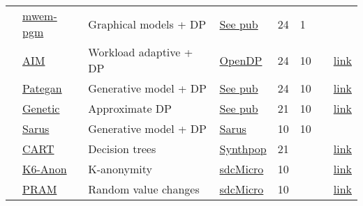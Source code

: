 \begin{table}
\begin{tabular}{llllllll}
        \cellcolor{ForestGreen} & \href{https://htmlpreview.github.io/?https://github.com/yoid2000/sdnist-summary/blob/main/results/mwem_pgm/report.html}{mwem-pgm} & Graphical models + DP & \href{https://dream.cs.umass.edu/}{See pub} & 24 & 1 & \cite{mckenna2019graphical} &  \\
        \cellcolor{ForestGreen} & \href{https://htmlpreview.github.io/?https://github.com/yoid2000/sdnist-summary/blob/main/results/aim_e_10_all/report.html}{AIM} & Workload adaptive + DP & \href{https://opendp.org/}{OpenDP} & 24 & 10 & \cite{mckenna2022aim} & \href{https://github.com/opendp/smartnoise-sdk}{link} \\
        \cellcolor{ForestGreen} & \href{https://htmlpreview.github.io/?https://github.com/yoid2000/sdnist-summary/blob/main/results/pategan_n_iter_50_e_10_all/report.html}{Pategan} & Generative model + DP & \href{https://github.com/PerceptionLab-DurhamUniversity/pategan}{See pub} & 24 & 10 & \cite{jordon2018pate} & \href{https://github.com/PerceptionLab-DurhamUniversity/pategan}{link} \\
        \cellcolor{YellowGreen} & \href{https://htmlpreview.github.io/?https://github.com/yoid2000/sdnist-summary/blob/main/results/genetic_sd_e_10_simple/report.html}{Genetic} & Approximate DP & \href{https://github.com/giusevtr/private_gsd}{See pub} & 21 & 10 & \cite{liu2023generating} & \href{https://github.com/giusevtr/private_gsd}{link} \\
        \cellcolor{YellowGreen} & \href{https://htmlpreview.github.io/?https://github.com/yoid2000/sdnist-summary/blob/main/results/sarus_sdg_demographic/report.html}{Sarus} & Generative model + DP & \href{https://www.sarus.tech/}{Sarus} & 10 & 10 & \cite{canale2022generative} &  \\
        \cellcolor{SkyBlue} & \href{https://htmlpreview.github.io/?https://github.com/yoid2000/sdnist-summary/blob/main/results/cart_cf21/report.html}{CART} & Decision trees & \href{https://synthpop.org.uk/}{Synthpop} & 21 &  & \cite{nowok2016synthpop} & \href{https://CRAN.R-project.org/package=synthpop}{link} \\
        \cellcolor{pink} & \href{https://htmlpreview.github.io/?https://github.com/yoid2000/sdnist-summary/blob/main/results/k_anonymity_k_6/report.html}{K6-Anon} & K-anonymity & \href{https://github.com/sdcTools/sdcMicro}{sdcMicro} & 10 &  & \cite{templ2015statistical} & \href{https://github.com/sdcTools/sdcMicro}{link} \\
        \cellcolor{Tan} & \href{https://htmlpreview.github.io/?https://github.com/yoid2000/sdnist-summary/blob/main/results/pram_default/report.html}{PRAM} & Random value changes & \href{https://github.com/sdcTools/sdcMicro}{sdcMicro} & 10 &  & \cite{meindl2019feedback} & \href{https://github.com/sdcTools/sdcMicro}{link} \\

\end{tabular}
\end{table}
